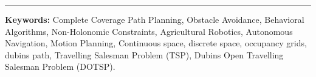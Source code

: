 \vspace*{6mm}   

\hrule

\vspace*{6mm}   

\textbf{Keywords:} Complete Coverage Path Planning, Obstacle Avoidance, Behavioral Algorithms, Non-Holonomic Constraints, Agricultural Robotics, Autonomous Navigation, Motion Planning, Continuous space, discrete space, occupancy grids, dubins path, Travelling Salesman Problem (TSP), Dubins Open Travelling Salesman Problem (DOTSP). 

